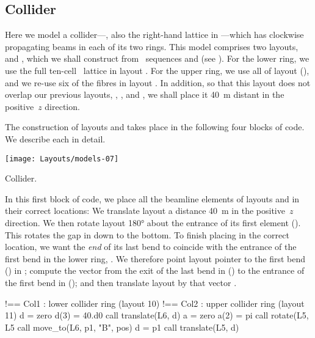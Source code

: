 \subsection{Collider}


%
Here we model a collider---, also the right-hand
lattice in ---which has clockwise propagating
beams in each of its two rings. This model comprises two layouts,
 and , which we shall construct from
\DNA\ sequences  and  (see ). For
the lower ring, we use the full ten-cell \PSR\ lattice in layout
. For the upper ring, we use all of layout 
(), and we re-use six of the fibres in layout
.%
In addition, so that this layout does not overlap our previous
layouts, , , and , we shall place
it \SI{40}{m} distant in the positive~$z$ direction.

The construction of layouts  and  takes place
in the following four blocks of code. We describe each in detail.

\begin{marginfigure}
  \texttt{[image: Layouts/models-07]}
  \caption{Collider.}
  \label{fig:col1.col2}
\end{marginfigure}

In this first block of code, we place all the beamline elements of
layouts  and  in their correct locations: We
translate layout  a distance \SI{40}{m} in the positive~$z$
direction. We then rotate layout  \ang{180} about the
entrance of its first element (). This
rotates the gap in  down to the bottom. To finish placing
 in the correct location, we want the \emph{end} of its
last bend to coincide with the entrance of the first bend in the
lower ring, . We therefore point layout pointer 
to the first bend () in ; compute the vector
 from the exit of the last bend in 
() to the entrance of the first bend in
 (); and then translate layout 
by that vector .
%
\begin{ptccode}
!== Col1 : lower collider ring (layout 10)
!== Col2 : upper collider ring (layout 11)
d = zero
d(3) = 40.d0
call translate(L6, d)
a = zero
a(2) = pi
call rotate(L5, L5%
call move_to(L6, p1, "B", pos)
d = p1%
call translate(L5, d)
\end{ptccode}

